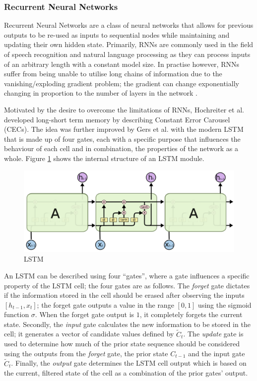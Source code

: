 \subsubsection{Recurrent Neural Networks}
Recurrent Neural Networks are a class of neural networks that allows for previous outputs to be re-used as inputs to sequential nodes while maintaining and updating their own hidden state. Primarily, RNNs are commonly used in the field of speech recognition and natural language processing as they can process inputs of an arbitrary length with a constant model size. In practise however, RNNs suffer from being unable to utilise long chains of information due to the vanishing/exploding gradient problem; the gradient can change exponentially changing in proportion to the number of layers in the network \cite{Hochreiter:01book}.

Motivated by the desire to overcome the limitations of RNNs, Hochreiter et al. \cite{hochreiter1997long} developed long-short term memory by describing Constant Error Carousel (CECs). The idea was further improved by Gers et al. \cite{gers1999learning} with the modern LSTM that is made up of four gates, each with a specific purpose that influences the behaviour of each cell and in combination, the properties of the network as a whole. Figure \ref{fig:bg:lstm} shows the internal structure of an LSTM module.

\begin{figure}[ht]
  \centering
  \includegraphics[width=0.75\columnwidth]{sections/2background/images/lstm.png}
  \caption[Structure of an unrolled LSTM]{LSTM}
  \label{fig:bg:lstm}
\end{figure}

An LSTM can be described using four ``gates'', where a gate influences a specific property of the LSTM cell; the four gates are as follows. The \textit{forget} gate dictates if the information stored in the cell should be erased after observing the inputs $[h_{t-1}, x_t]$; the forget gate outputs a value in the range $[0, 1]$ using the sigmoid function $\sigma$. When the forget gate output is $1$, it completely forgets the current state. Secondly, the \textit{input} gate calculates the new information to be stored in the cell; it generates a vector of candidate values defined by $\tilde{C}_t$. The \textit{update} gate is used to determine how much of the prior state sequence should be considered using the outputs from the \textit{forget} gate, the prior state $C_{t-1}$ and the input gate $\tilde{C}_t$. Finally, the \textit{output} gate determines the LSTM cell output which is based on the current, filtered state of the cell as a combination of the prior gates' output.

